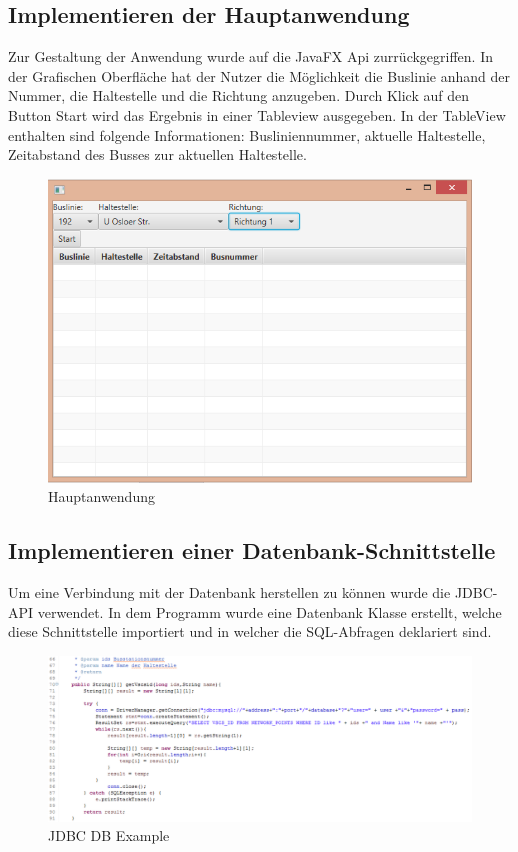 \documentclass[a4paper, 12pt]{scrartcl}
\begin{document}
\subsection{Implementieren der Hauptanwendung}
Zur Gestaltung der Anwendung wurde auf die JavaFX Api zurrückgegriffen. 
In der Grafischen Oberfläche hat der Nutzer die Möglichkeit die Buslinie anhand der Nummer, 
die Haltestelle und die Richtung anzugeben. Durch Klick auf den Button Start wird das Ergebnis in einer Tableview ausgegeben. In der TableView enthalten sind folgende Informationen:
Busliniennummer, aktuelle Haltestelle, Zeitabstand des Busses zur aktuellen Haltestelle.

\begin{figure}[h]
	\centering
	\includegraphics[scale=0.55]{Hauptanwendung.png}
	\caption{Hauptanwendung}
	\label{img:Hauptanwendung}
\end{figure}

\subsection{Implementieren einer Datenbank-Schnittstelle}
Um eine Verbindung mit der Datenbank herstellen zu können wurde die JDBC-API verwendet. In dem Programm wurde eine Datenbank Klasse erstellt, welche diese Schnittstelle importiert und in welcher die SQL-Abfragen deklariert sind.

\begin{figure}[h]
	\centering
	\includegraphics[scale=0.55]{jdbc-database-example.png}
	\caption{JDBC DB Example}
	\label{img:JDBC}
\end{figure}
\newpage
\end{document}
